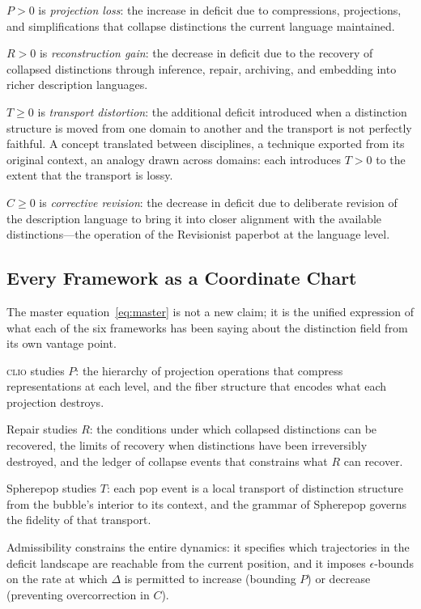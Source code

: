 \documentclass[12pt, letterpaper]{article}
\theoremstyle{remark}
\newcommand{\clio}{\textsc{clio}}
\begin{document}
$P > 0$ is \emph{projection loss}: the increase in deficit due to compressions,
projections, and simplifications that collapse distinctions the current
language maintained.

$R > 0$ is \emph{reconstruction gain}: the decrease in deficit due to
the recovery of collapsed distinctions through inference, repair, archiving,
and embedding into richer description languages.

$T \geq 0$ is \emph{transport distortion}: the additional deficit introduced
when a distinction structure is moved from one domain to another and the
transport is not perfectly faithful.  A concept translated between disciplines,
a technique exported from its original context, an analogy drawn across
domains: each introduces $T > 0$ to the extent that the transport is lossy.

$C \geq 0$ is \emph{corrective revision}: the decrease in deficit due to
deliberate revision of the description language to bring it into closer
alignment with the available distinctions---the operation of the Revisionist
paperbot at the language level.

\subsection{Every Framework as a Coordinate Chart}

The master equation~\eqref{eq:master} is not a new claim; it is the unified
expression of what each of the six frameworks has been saying about the
distinction field from its own vantage point.

\clio{} studies $P$: the hierarchy of projection operations that compress
representations at each level, and the fiber structure that encodes what
each projection destroys.

Repair studies $R$: the conditions under which collapsed distinctions can
be recovered, the limits of recovery when distinctions have been irreversibly
destroyed, and the ledger of collapse events that constrains what $R$ can
recover.

Spherepop studies $T$: each pop event is a local transport of distinction
structure from the bubble's interior to its context, and the grammar of
Spherepop governs the fidelity of that transport.

Admissibility constrains the entire dynamics: it specifies which trajectories
in the deficit landscape are reachable from the current position, and it
imposes $\epsilon$-bounds on the rate at which $\Delta$ is permitted to
increase (bounding $P$) or decrease (preventing overcorrection in $C$).
\end{document}
